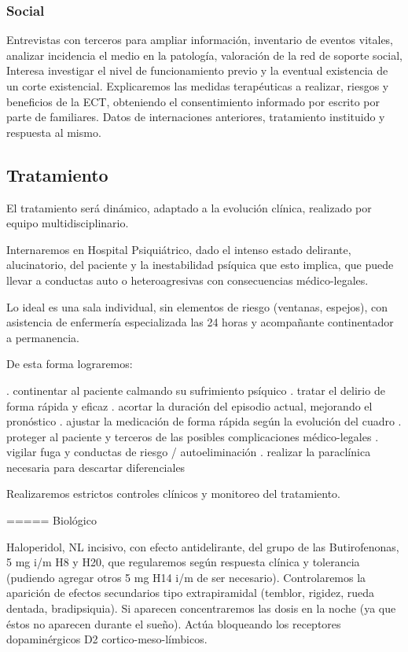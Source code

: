 \subsubsection*{Social}
Entrevistas con terceros para ampliar información, inventario de eventos vitales, analizar incidencia el medio en la patología, valoración de la red de soporte social, Interesa investigar el nivel de funcionamiento previo y la eventual existencia de un corte existencial. Explicaremos las medidas terapéuticas a realizar, riesgos y beneficios de la ECT, obteniendo el consentimiento informado por escrito por parte de familiares. Datos de internaciones anteriores, tratamiento instituido y respuesta al mismo.
\subsection*{Tratamiento}
El tratamiento será dinámico, adaptado a la evolución clínica, realizado por equipo multidisciplinario.

Internaremos en Hospital Psiquiátrico, dado el intenso estado delirante, alucinatorio, del paciente y la inestabilidad psíquica que esto implica, que puede llevar a conductas auto o heteroagresivas con consecuencias médico-legales.

Lo ideal es una sala individual, sin elementos de riesgo (ventanas, espejos), con asistencia de enfermería especializada las 24 horas y acompañante continentador a permanencia.

De esta forma lograremos:

. continentar al paciente calmando su sufrimiento psíquico
. tratar el delirio de forma rápida y eficaz
. acortar la duración del episodio actual, mejorando el pronóstico
. ajustar la medicación de forma rápida según la evolución del cuadro
. proteger al paciente y terceros de las posibles complicaciones médico-legales
. vigilar fuga y conductas de riesgo / autoeliminación
. realizar la paraclínica necesaria para descartar diferenciales

Realizaremos estrictos controles clínicos y monitoreo del tratamiento.

===== Biológico

Haloperidol, NL incisivo, con efecto antidelirante, del grupo de las Butirofenonas, 5 mg i/m H8 y H20, que regularemos según respuesta clínica y tolerancia (pudiendo agregar otros 5 mg H14 i/m de ser necesario). Controlaremos la aparición de efectos secundarios tipo extrapiramidal (temblor, rigidez, rueda dentada, bradipsiquia). Si aparecen concentraremos las dosis en la noche (ya que éstos no aparecen durante el sueño).
Actúa bloqueando los receptores dopaminérgicos D2 cortico-meso-límbicos.


